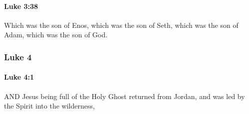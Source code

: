 		\paragraph{Luke 3:38} %
			\label{LUKE-3-38}

			Which was the son of Enos, which was the son of Seth, which was the son of Adam, which was the son of God.

			\begin{framed}
			\scriptsize
				\begin{compactdesc}
					\item[SBLG] 
				\end{compactdesc}
			\end{framed}

	\subsubsection{Luke 4} %
		\label{LUKE-4}
		
		\paragraph{Luke 4:1} %
			\label{LUKE-4-1}

			AND Jesus being full of the Holy Ghost returned from Jordan, and was led by the Spirit into the wilderness,

